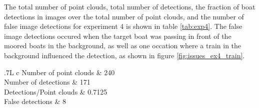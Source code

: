 The total number of point clouds, total number of detections, the fraction of boat detections in images over the total number of point clouds, and the number of false image detections for experiment 4 is shown in table \ref{tab:exp4}. The false image detections occured when the target boat was passing in front of the moored boats in the background, as well as one occation where a train in the background influenced the detection, as shown in figure \ref{fig:issues_ex4_train}.
\begin{table}[H]
	\centering
	\begin{tabularx}{.7\linewidth}{L c}
		\toprule
		Number of point clouds & 240\\
		\midrule
		Number of detections & 171\\
		\midrule
		Detections/Point clouds & 0.7125 \\
		\midrule
		False detections & 8\\
		\bottomrule
	\end{tabularx}
	\caption{Data from experiment 4.}
	\label{tab:exp4}
\end{table}
